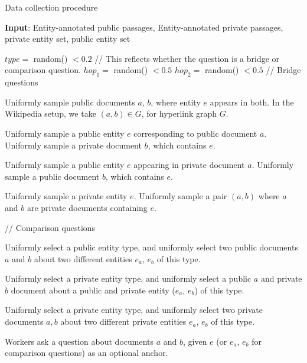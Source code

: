 \documentclass{article}
\begin{document}
\begin{algorithm}[t!]
\caption{Data collection procedure}
\label{CHalgorithm}
\begin{algorithmic}[1]
\State \textbf{Input}: Entity-annotated public passages, Entity-annotated private passages, private entity set, public entity set

\State $type  =$  random() $<0.2$ // This reflects whether the question is a bridge or comparison question. 
\State $hop_1 =$  random() $<0.5$
\State $hop_2 =$  random() $<0.5$
\newline
\State // Bridge questions
\State \parbox[t]{\dimexpr\linewidth-\algorithmicindent*3}{Uniformly sample public documents $a$, $b$, where entity $e$ appears in both. In the Wikipedia setup, we take $(a, b) \in G$, for hyperlink graph $G$.}
\State \parbox[t]{\dimexpr\linewidth-\algorithmicindent*3}{Uniformly sample a public entity $e$ corresponding to public document $a$. Uniformly sample a private document $b$, which contains $e$.}
\State \parbox[t]{\dimexpr\linewidth-\algorithmicindent*3}{Uniformly sample a public entity $e$ appearing in private document $a$. Uniformly sample a public document $b$, which contains $e$.}
\State \parbox[t]{\dimexpr\linewidth-\algorithmicindent*3}{Uniformly sample a private entity $e$. Uniformly sample a pair $(a, b)$ where $a$ and $b$ are private documents containing $e$.}
\EndIf\EndIf \newline
\State // Comparison questions
\State \parbox[t]{\dimexpr\linewidth-\algorithmicindent*3}{Uniformly select a public entity type, and uniformly select two public documents $a$ and $b$ about two different entities $e_a$, $e_b$ of this type.}
\State \parbox[t]{\dimexpr\linewidth-\algorithmicindent*3}{Uniformly select a private entity type, and uniformly select a public $a$ and private $b$ document about a public and private entity ($e_a$, $e_b$) of this type.}
\State \parbox[t]{\dimexpr\linewidth-\algorithmicindent*3}{Uniformly select a private entity type, and uniformly select two private documents $a, b$ about two different private entities $e_a$, $e_b$ of this type.}
\EndIf\EndIf

\State \parbox[t]{\dimexpr\linewidth-\algorithmicindent*2}{Workers ask a question about documents $a$ and $b$, given $e$ (or $e_a$, $e_b$ for comparison questions) as an optional anchor.}
\EndWhile
\end{algorithmic}
\end{algorithm}
\end{document}
